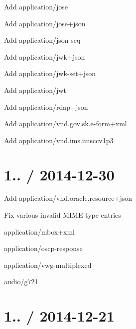 \begin{DoxyItemize}
\item Add {\ttfamily application/jose}
\item Add {\ttfamily application/jose+json}
\item Add {\ttfamily application/json-\/seq}
\item Add {\ttfamily application/jwk+json}
\item Add {\ttfamily application/jwk-\/set+json}
\item Add {\ttfamily application/jwt}
\item Add {\ttfamily application/rdap+json}
\item Add {\ttfamily application/vnd.\+gov.\+sk.\+e-\/form+xml}
\item Add {\ttfamily application/vnd.\+ims.\+imsccv1p3}
\end{DoxyItemize}

\section*{1.. / 2014-\/12-\/30 }


\begin{DoxyItemize}
\item Add {\ttfamily application/vnd.\+oracle.\+resource+json}
\item Fix various invalid M\+I\+ME type entries
\begin{DoxyItemize}
\item {\ttfamily application/mbox+xml}
\item {\ttfamily application/oscp-\/response}
\item {\ttfamily application/vwg-\/multiplexed}
\item {\ttfamily audio/g721}
\end{DoxyItemize}
\end{DoxyItemize}

\section*{1.. / 2014-\/12-\/21 }


